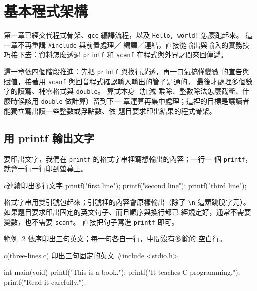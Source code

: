 \chapter{基本程式架構}
\label{ch:basicprogramstructure}

第一章已經交代程式骨架、\texttt{gcc} 編譯流程，以及 \texttt{Hello,
world!} 怎麼跑起來。 這一章不再重講 \texttt{\#include} 與前置處理／
編譯／連結，直接從輸出與輸入的實務技巧接下去：資料怎麼透過
\texttt{printf} 和 \texttt{scanf} 在程式與外界之間來回傳遞。

這一章依四個階段推進：先把 \texttt{printf} 與換行講透，再一口氣搞懂變數
的宣告與賦值，接著用 \texttt{scanf} 與回音程式確認輸入輸出的管子是通的，
最後才處理多個數字的讀寫、補零格式與 \texttt{double}。 算式本身（加減
乘除、整數除法怎麼截斷、什麼時候該用 \texttt{double} 做計算）留到下一
章運算再集中處理；這裡的目標是讓讀者能獨立寫出讀一些整數或浮點數、依
題目要求印出結果的程式骨架。

\section{用 printf 輸出文字}
\label{sec:basic-printf}

要印出文字，我們在 \texttt{printf} 的格式字串裡寫想輸出的內容；一行一
個 \texttt{printf}，就會一行一行印到螢幕上。

\begin{code}{c}{連續印出多行文字}
printf("first line\n");
printf("second line\n");
printf("third line\n");
\end{code}

格式字串用雙引號包起來；引號裡的內容會原樣輸出（除了 \texttt{\textbackslash n}
這類跳脫字元）。 如果題目要求印出固定的英文句子、而且順序與換行都已
經規定好，通常不需要變數，也不需要 \texttt{scanf}。 直接把句子寫進
\texttt{printf} 即可。

範例 \thechapter.2 依序印出三句英文；每一句各自一行，中間沒有多餘的
空白行。

\begin{example}{c}{(three-lines.c) 印出三句固定的英文}
#include <stdio.h>

int main(void) {
    printf("This is a book.\n");
    printf("It teaches C programming.\n");
    printf("Read it carefully.\n");
}
\end{example}


